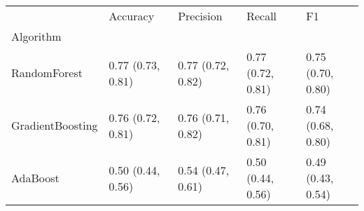 \begin{tabular}{lllll}
\toprule
{} &           Accuracy &          Precision &             Recall &                 F1 \\
Algorithm        &                    &                    &                    &                    \\
\midrule
RandomForest     &  0.77 (0.73, 0.81) &  0.77 (0.72, 0.82) &  0.77 (0.72, 0.81) &  0.75 (0.70, 0.80) \\
GradientBoosting &  0.76 (0.72, 0.81) &  0.76 (0.71, 0.82) &  0.76 (0.70, 0.81) &  0.74 (0.68, 0.80) \\
AdaBoost         &  0.50 (0.44, 0.56) &  0.54 (0.47, 0.61) &  0.50 (0.44, 0.56) &  0.49 (0.43, 0.54) \\
\bottomrule
\end{tabular}

